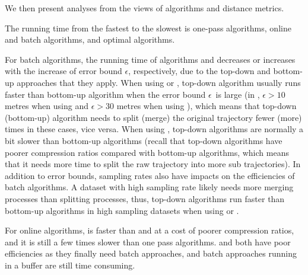 


We then present analyses from the views of \lsa algorithms and distance metrics.


The running time from the fastest to the slowest is one-pass algorithms, online and batch algorithms, and optimal algorithms.

For batch algorithms, the running time of algorithms \dpa and \tpa decreases or increases with the increase of error bound $\epsilon$, respectively, due to the top-down and bottom-up approaches that they apply. When using \ped or \sed, top-down algorithm usually runs faster than bottom-up algorithm when the error bound $\epsilon$~is large (\eg in \geolife, $\epsilon >10$ metres when using \ped and $\epsilon >30$ metres when using \sed), which means that top-down (bottom-up) algorithm needs to split (merge) the original trajectory fewer (more) times in these cases, vice versa. When using \dad,  top-down algorithms are normally a bit slower than bottom-up algorithms (recall that top-down algorithms have poorer compression ratios compared with bottom-up algorithms, which means that it needs more time to split the raw trajectory into more sub trajectories).
In addition to error bounds, sampling rates also have impacts on the efficiencies of batch algorithms. A dataset with high sampling rate likely needs more merging processes than splitting processes, thus, top-down algorithms run faster than bottom-up algorithms in high sampling datasets when using \ped or \sed.

For online algorithms, \squishe is faster than \bqsa and \opwa at a cost of poorer compression ratios, and it is still a few times slower than one pass algorithms. \bqsa and \opwa both have poor efficiencies as they finally need batch approaches, and batch approaches running in a buffer are still time consuming.

